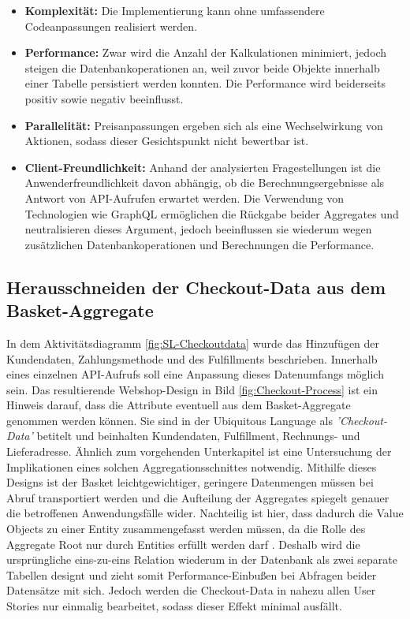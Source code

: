 \begin{itemize}[topsep=-2pt]
	\item \textbf{Komplexität: } { Die Implementierung kann ohne umfassendere Codeanpassungen realisiert werden. }
	\item \textbf{Performance: } { Zwar wird die Anzahl der Kalkulationen minimiert, jedoch steigen die Datenbankoperationen an, weil zuvor beide Objekte innerhalb einer Tabelle persistiert werden konnten. Die Performance wird beiderseits positiv sowie negativ beeinflusst. }
	\item \textbf{Parallelität: } { Preisanpassungen ergeben sich als eine Wechselwirkung von Aktionen, sodass dieser Gesichtspunkt nicht bewertbar ist. }
	\item \textbf{Client-Freundlichkeit: } { Anhand der analysierten Fragestellungen ist die Anwenderfreundlichkeit davon abhängig, ob die Berechnungsergebnisse als Antwort von API-Aufrufen erwartet werden. Die Verwendung von Technologien wie GraphQL ermöglichen die Rückgabe beider Aggregates und neutralisieren dieses Argument, jedoch beeinflussen sie wiederum wegen zusätzlichen Datenbankoperationen und Berechnungen die Performance. }
\end{itemize}



\subsection{Herausschneiden der Checkout-Data aus dem Basket-Aggregate}

In dem Aktivitätsdiagramm \ref{fig:SL-Checkoutdata} wurde das Hinzufügen der Kundendaten, Zahlungsmethode und des Fulfillments beschrieben. Innerhalb eines einzelnen API-Aufrufs soll eine Anpassung dieses Datenumfangs möglich sein. Das resultierende Webshop-Design in Bild \ref{fig:Checkout-Process} ist ein Hinweis darauf, dass die Attribute eventuell aus dem Basket-Aggregate genommen werden können. Sie sind in der Ubiquitous Language als \emph{'Checkout-Data'} betitelt und beinhalten Kundendaten, Fulfillment, Rechnungs- und Lieferadresse. Ähnlich zum vorgehenden Unterkapitel ist eine Untersuchung der Implikationen eines solchen Aggregationsschnittes notwendig. Mithilfe dieses Designs ist der Basket leichtgewichtiger, geringere Datenmengen müssen bei Abruf transportiert werden und die Aufteilung der Aggregates spiegelt genauer die betroffenen Anwendungsfälle wider. Nachteilig ist hier, dass dadurch die Value Objects zu einer Entity zusammengefasst werden müssen, da die Rolle des Aggregate Root nur durch Entities erfüllt werden darf \cite[S. 129]{Evans.2011}. Deshalb wird die ursprüngliche eins-zu-eins Relation wiederum in der Datenbank als zwei separate Tabellen designt und zieht somit Performance-Einbußen bei Abfragen beider Datensätze mit sich. Jedoch werden die Checkout-Data in nahezu allen User Stories nur einmalig bearbeitet, sodass dieser Effekt minimal ausfällt. 

